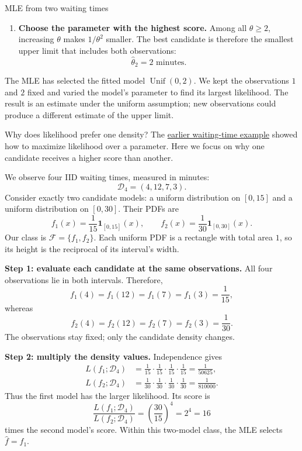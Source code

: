 \documentclass[a4paper,12pt,oneside]{report}
\begin{document}
\begin{framedexample}{MLE from two waiting times}
\begin{enumerate}[label=\textbf{Step \arabic*:},leftmargin=*]
  \item \textbf{Choose the parameter with the highest score.}
  Among all $\theta\geq2$, increasing $\theta$ makes
  $1/\theta^2$ smaller. The best candidate is therefore the
  smallest upper limit that includes both observations:
  \[
    \boxed{\widehat\theta_2=2\text{ minutes}.}
  \]
\end{enumerate}
The MLE has selected the fitted model $\operatorname{Unif}(0,2)$.
We kept the observations $1$ and $2$ fixed and varied the model's
parameter to find its largest likelihood. The result is an estimate
under the uniform assumption; new observations could produce
a different estimate of the upper limit.
\end{framedexample}

\begin{framedexample}{Why does likelihood prefer one density?}
\label{ex:mle-comparing-two-densities}
The \hyperref[ex:mle-two-waiting-times]{earlier waiting-time example}
showed how to maximize likelihood over a parameter. Here we focus
on why one candidate receives a higher score than another.

We observe four IID waiting times, measured in minutes:
\[
  \mathcal D_4=(4,12,7,3).
\]
Consider exactly two candidate models: a uniform distribution
on $[0,15]$ and a uniform distribution on $[0,30]$. Their PDFs are
\[
  f_1(x)=\frac1{15}\mathbf1_{[0,15]}(x),
  \qquad
  f_2(x)=\frac1{30}\mathbf1_{[0,30]}(x).
\]
Our class is $\mathcal F=\{f_1,f_2\}$. Each uniform PDF is a
rectangle with total area $1$, so its height is the reciprocal
of its interval's width.

\textbf{Step 1: evaluate each candidate at the same observations.}
All four observations lie in both intervals. Therefore,
\[
  f_1(4)=f_1(12)=f_1(7)=f_1(3)=\frac1{15},
\]
whereas
\[
  f_2(4)=f_2(12)=f_2(7)=f_2(3)=\frac1{30}.
\]
The observations stay fixed; only the candidate density changes.

\textbf{Step 2: multiply the density values.}
Independence gives
\begin{align*}
  L(f_1;\mathcal D_4)
    &=\frac1{15}\cdot\frac1{15}\cdot\frac1{15}\cdot\frac1{15}
      =\frac1{50625},\\
  L(f_2;\mathcal D_4)
    &=\frac1{30}\cdot\frac1{30}\cdot\frac1{30}\cdot\frac1{30}
      =\frac1{810000}.
\end{align*}
Thus the first model has the larger likelihood. Its score is
\[
  \frac{L(f_1;\mathcal D_4)}{L(f_2;\mathcal D_4)}
    =\left(\frac{30}{15}\right)^4=2^4=16
\]
times the second model's score. Within this two-model class,
the MLE selects $\widehat f=f_1$.


\end{framedexample}
\end{document}
